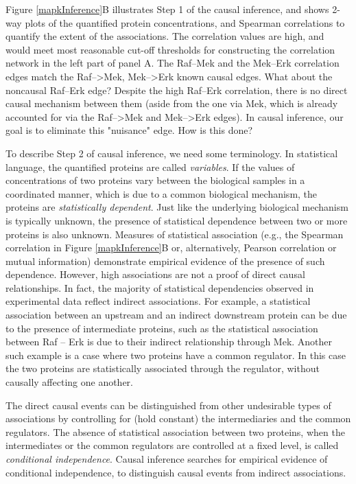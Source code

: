 \documentclass[journal=jacsat,manuscript=article]{achemso}
\begin{document}
Figure \ref{mapkInference}B illustrates Step 1 of the causal inference, and shows 2-way plots of the quantified protein concentrations, and Spearman correlations to quantify the extent of the associations.  The correlation values are high, and would meet most reasonable cut-off thresholds for constructing the correlation network in the left part of panel A.  The Raf--Mek and the Mek--Erk correlation edges match the Raf-->Mek, Mek-->Erk known causal edges.  What about the noncausal Raf--Erk edge? Despite the high Raf--Erk correlation, there is no direct causal mechanism between them (aside from the one via Mek, which is already accounted for via the Raf-->Mek and Mek-->Erk edges).  In causal  inference, our goal is to eliminate this "nuisance" edge.  How is this done?

To describe Step 2 of causal inference, we need some terminology. In statistical language, the quantified proteins are called {\it variables}. If the values of concentrations of two proteins vary between the biological samples in a coordinated manner, which is due to a common biological mechanism, the proteins are {\it statistically dependent}.  Just like the underlying biological mechanism is typically unknown, the presence of statistical dependence between two or more proteins is also unknown. Measures of statistical association (e.g.,  the Spearman correlation in Figure \ref{mapkInference}B or, alternatively, Pearson correlation or mutual information) demonstrate empirical evidence of the presence of such dependence. However, high associations are not a proof of direct causal relationships. In fact, the majority of statistical dependencies observed in experimental data reflect indirect associations. For example, a statistical association between an upstream and an indirect downstream protein can be due to the presence of intermediate proteins, such as the statistical association between Raf -- Erk is due to their indirect relationship through Mek. Another such example is a case where two proteins have a common regulator. In this case the two proteins are statistically associated through the regulator, without causally affecting one another. 

The direct causal events can be distinguished from other undesirable types of associations by controlling for (hold constant) the intermediaries and the common regulators. The absence of statistical association between two proteins, when the intermediates or the common regulators are controlled at a fixed level, is called {\it conditional independence}.  Causal inference searches for empirical evidence of conditional independence, to distinguish causal events from indirect associations. 
\end{document}
